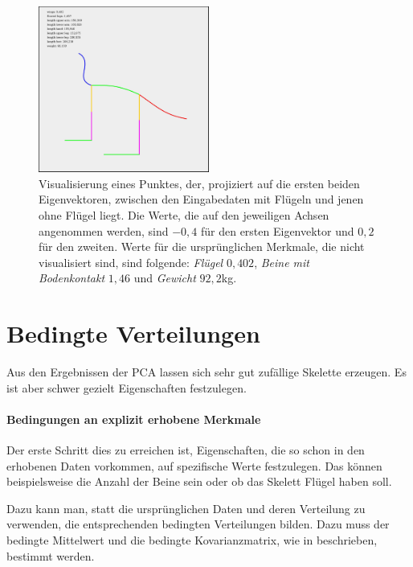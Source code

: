  \begin{figure}[H]
  \centering
  \includegraphics[width=0.5\textwidth]{graphics/betweenClusters.jpg}
  \caption{Visualisierung eines Punktes, der, projiziert auf die ersten beiden Eigenvektoren, zwischen den Eingabedaten mit Flügeln und jenen ohne Flügel liegt. Die Werte, die auf den jeweiligen Achsen angenommen werden, sind $-0{,}4$ für den ersten Eigenvektor und $0{,}2$ für den zweiten. Werte für die ursprünglichen Merkmale, die nicht visualisiert sind, sind folgende: \emph{Flügel} $0{,}402$, \emph{Beine mit Bodenkontakt} $1{,}46$ und \emph{Gewicht} $92{,}2$kg.}
  \label{between_clusters}
 \end{figure}

 
 \newpage
 \section{Bedingte Verteilungen}
 \label{pca_conditions}
 
 Aus den Ergebnissen der PCA lassen sich sehr gut zufällige Skelette erzeugen. Es ist aber schwer gezielt Eigenschaften festzulegen.
 
 \paragraph{Bedingungen an explizit erhobene Merkmale}
 Der erste Schritt dies zu erreichen ist, Eigenschaften, die so schon in den erhobenen Daten vorkommen, auf spezifische Werte festzulegen. Das können beispielsweise die Anzahl der Beine sein oder ob das Skelett Flügel haben soll.
 
 Dazu kann man, statt die ursprünglichen Daten und deren Verteilung zu verwenden, die entsprechenden bedingten Verteilungen bilden. Dazu muss der bedingte Mittelwert und die bedingte Kovarianzmatrix, wie in \cite[S.\ $116$ f.]{conditionalDistribution} beschrieben, bestimmt werden.
 
